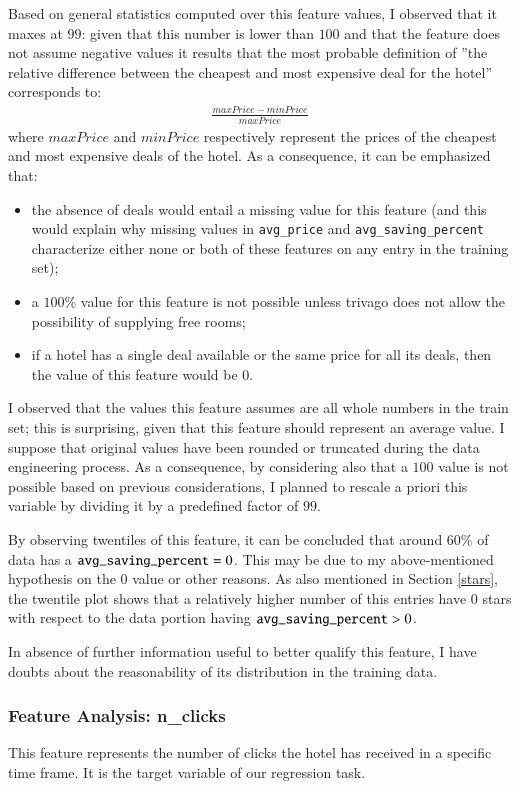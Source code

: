 \documentclass[preprint,12pt,3p]{elsarticle}
\begin{document}
Based on general statistics computed over this feature values, I observed that it maxes at $99$: given that this number is lower than $100$ and that the feature does not assume negative values it results that the most probable definition of ''the relative difference between the cheapest and most expensive deal for the hotel'' corresponds to:
\begin{align}
\frac{maxPrice-minPrice}{maxPrice}
\end{align}
where $maxPrice$ and $minPrice$ respectively represent the prices of the cheapest and most expensive deals of the hotel. As a consequence, it can be emphasized that:
\begin{itemize}
	\item the absence of deals would entail a missing value for this feature (and this would explain why missing values in \verb|avg_price| and \verb|avg_saving_percent| characterize either none or both of these features on any entry in the training set);
	\item a $100\%$ value for this feature is not possible unless trivago does not allow the possibility of supplying free rooms;
	\item if a hotel has a single deal available or the same price for all its deals, then the value of this feature would be $0$.
\end{itemize}

I observed that the values this feature assumes are all whole numbers in the train set; this is surprising, given that this feature should represent an average value. I suppose that original values have been rounded or truncated during the data engineering process. As a consequence, by considering also that a $100$ value is not possible based on previous considerations, I planned to rescale a priori this variable by dividing it by a predefined factor of $99$.

By observing twentiles of this feature, it can be concluded that around $60\%$ of data has a $\verb|avg_saving_percent|=0$. This may be due to my above-mentioned hypothesis on the $0$ value or other reasons. As also mentioned in Section \ref{stars}, the twentile plot shows that a relatively higher number of this entries have $0$ stars with respect to the data portion having $\verb|avg_saving_percent|>0$.

In absence of further information useful to better qualify this feature, I have doubts about the reasonability of its distribution in the training data.

\subsubsection{Feature Analysis: n\_clicks}
This feature represents the number of clicks the hotel has received in a specific time frame. It is the target variable of our regression task.
\end{document}

